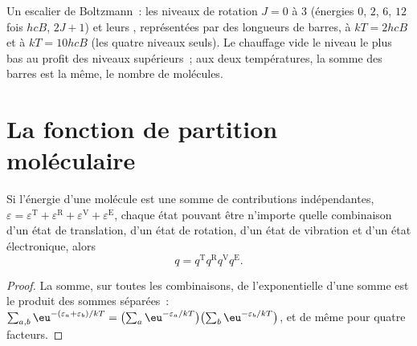 \begin{omfigure}

{\small Un escalier de Boltzmann~: les niveaux de rotation $J = 0$ à 3
(énergies $0$, $2$, $6$,
$12$ fois $hcB$,  $2J + 1$) et leurs ,
représentées par des longueurs de barres, à $kT = 2hcB$ et à
$kT = 10hcB$ (les quatre niveaux seuls). Le chauffage vide le niveau le
plus bas au profit des niveaux supérieurs~; aux deux températures, la
somme des barres est la même, le nombre de molécules.}
\end{omfigure}

\section{La fonction de partition moléculaire}

\begin{proposition}[Factorisation]\label{prop:b3:partition-functions:factorisation}
Si l'énergie d'une molécule est une somme de contributions
indépendantes,
$\varepsilon = \varepsilon^{\mathrm T} + \varepsilon^{\mathrm R} + \varepsilon^{\mathrm V} + \varepsilon^{\mathrm E}$,
chaque état pouvant être n'importe quelle combinaison d'un état de
translation, d'un état de rotation, d'un état de vibration et d'un état
électronique, alors
\[
  q = q^{\mathrm T}q^{\mathrm R}q^{\mathrm V}q^{\mathrm E}.
\]
\end{proposition}

\begin{proof}
La somme, sur toutes les combinaisons, de l'exponentielle d'une somme est
le produit des sommes séparées~: $\sum_{a,b}\eu^{-(\varepsilon_a+\varepsilon_b)/kT} = \bigl(\sum_a\eu^{-\varepsilon_a/kT}\bigr)
\bigl(\sum_b\eu^{-\varepsilon_b/kT}\bigr)$, et de même pour quatre
facteurs.
\end{proof}

